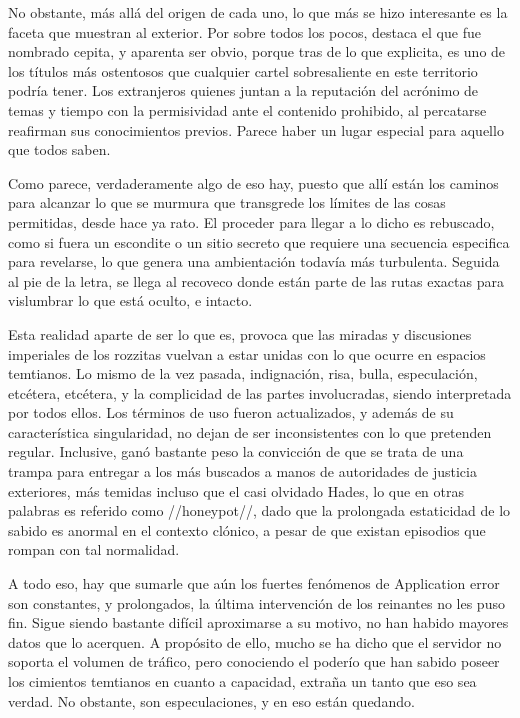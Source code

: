 \documentclass[
]{book}
\begin{document}
No obstante, más allá del origen de cada uno, lo que más se hizo interesante es la faceta que muestran al exterior. Por sobre todos los pocos, destaca el que fue nombrado cepita, y aparenta ser obvio, porque tras de lo que explicita, es uno de los títulos más ostentosos que cualquier cartel sobresaliente en este territorio podría tener. Los extranjeros quienes juntan a la reputación del acrónimo de temas y tiempo con la permisividad ante el contenido prohibido, al percatarse reafirman sus conocimientos previos. Parece haber un lugar especial para aquello que todos saben.

Como parece, verdaderamente algo de eso hay, puesto que allí están los caminos para alcanzar lo que se murmura que transgrede los límites de las cosas permitidas, desde hace ya rato. El proceder para llegar a lo dicho es rebuscado, como si fuera un escondite o un sitio secreto que requiere una secuencia especifica para revelarse, lo que genera una ambientación todavía más turbulenta. Seguida al pie de la letra, se llega al recoveco donde están parte de las rutas exactas para vislumbrar lo que está oculto, e intacto.

Esta realidad aparte de ser lo que es, provoca que las miradas y discusiones imperiales de los rozzitas vuelvan a estar unidas con lo que ocurre en espacios temtianos. Lo mismo de la vez pasada, indignación, risa, bulla, especulación, etcétera, etcétera, y la complicidad de las partes involucradas, siendo interpretada por todos ellos. Los términos de uso fueron actualizados, y además de su característica singularidad, no dejan de ser inconsistentes con lo que pretenden regular. Inclusive, ganó bastante peso la convicción de que se trata de una trampa para entregar a los más buscados a manos de autoridades de justicia exteriores, más temidas incluso que el casi olvidado Hades, lo que en otras palabras es referido como //honeypot//, dado que la prolongada estaticidad de lo sabido es anormal en el contexto clónico, a pesar de que existan episodios que rompan con tal normalidad.

A todo eso, hay que sumarle que aún los fuertes fenómenos de Application error son constantes, y prolongados, la última intervención de los reinantes no les puso fin. Sigue siendo bastante difícil aproximarse a su motivo, no han habido mayores datos que lo acerquen. A propósito de ello, mucho se ha dicho que el servidor no soporta el volumen de tráfico, pero conociendo el poderío que han sabido poseer los cimientos temtianos en cuanto a capacidad, extraña un tanto que eso sea verdad. No obstante, son especulaciones, y en eso están quedando.
\end{document}
